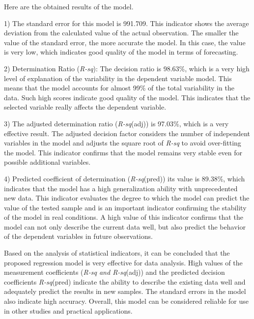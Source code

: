 \begin{multicols}{2}
Here are the obtained results of the model.

1) The standard error for this model is 991.709. This indicator shows
the average deviation from the calculated value of the actual
observation. The smaller the value of the standard error, the more
accurate the model. In this case, the value is very low, which indicates
good quality of the model in terms of forecasting.

2) Determination Ratio (\emph{R-sq}): The decision ratio is 98.63\%,
which is a very high level of explanation of the variability in the
dependent variable model. This means that the model accounts for almost
99\% of the total variability in the data. Such high scores indicate
good quality of the model. This indicates that the selected variable
really affects the dependent variable.

3) The adjusted determination ratio (\emph{R-sq}(adj)) is 97.03\%, which
is a very effective result. The adjusted decision factor considers the
number of independent variables in the model and adjusts the square root
of \emph{R-sq} to avoid over-fitting the model. This indicator confirms
that the model remains very stable even for possible additional
variables.

4) Predicted coefficient of determination (\emph{R-sq}(pred)) its value
is 89.38\%, which indicates that the model has a high generalization
ability with unprecedented new data. This indicator evaluates the degree
to which the model can predict the value of the tested sample and is an
important indicator confirming the stability of the model in real
conditions. A high value of this indicator confirms that the model can
not only describe the current data well, but also predict the behavior
of the dependent variables in future observations.

Based on the analysis of statistical indicators, it can be concluded
that the proposed regression model is very effective for data analysis.
High values \hspace{0pt}\hspace{0pt}of the measurement coefficients
(\emph{R-sq and R-sq}(adj)) and the predicted decision coefficients
\emph{R-sq}(pred) indicate the ability to describe the existing data
well and adequately predict the results in new samples. The standard
errors in the model also indicate high accuracy. Overall, this model can
be considered reliable for use in other studies and practical
applications.
\end{multicols}

